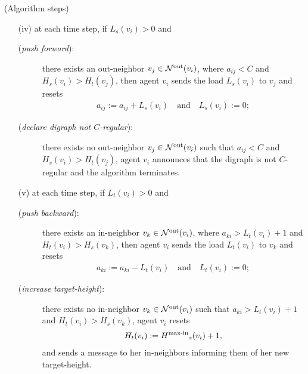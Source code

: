 \documentclass[final]{siamltex}
\begin{document}
(Algorithm steps)
\begin{enumerate}

\item[(iv)] at each time step, if $ L_s(v_i)>0 $ and
  \begin{description}

  \item[(\emph{push forward}):] there exists an out-neighbor $ v_j \in
    {{{\mathcal{N}}^{\textup{{out}}}}}(v_i) $, where $ a_{ij}< C $ and $ H_s(v_i) > H_t(v_j) $,
    then agent $ v_i $ sends the load $ L_s(v_i) $ to $ v_j $ and
    resets
    \begin{align*}
      a_{ij}:=a_{ij}+ L_s(v_i) \quad \text{and} \quad L_s(v_i):=0 ;
    \end{align*}

  \item[(\emph{declare digraph not $ C $-regular}):] there exists no
    out-neighbor $ v_j \in {{{\mathcal{N}}^{\textup{{out}}}}}(v_i) $ such that $ a_{ij}< C $ and $
    H_s(v_i) > H_t(v_j) $, agent $ v_i $ announces that the digraph is
    not $ C $-regular and the algorithm terminates.

  \end{description}

\item[(v)] at each time step, if $ L_t(v_i)>0 $ and
  \begin{description}
  \item[(\emph{push backward}):] there exists an in-neighbor $ v_k \in
    {{{\mathcal{N}}^{\textup{{out}}}}}(v_i) $, where $ a_{ki}> L_t(v_i)+1 $ and $ H_t(v_i) >
    H_s(v_k) $, then agent $ v_i $ sends the load $ L_t(v_i) $ to $
    v_k $ and resets
    \begin{align*}
      a_{ki}:=a_{ki}-L_t(v_i) \quad \text{and} \quad L_t(v_i):=0 ;
    \end{align*}
  \item[(\emph{increase target-height}):] there exists no
    in-neighbor $ v_k \in {{{\mathcal{N}}^{\textup{{out}}}}}(v_i) $ such that $ a_{ki}> L_t(v_i)+1
    $ and $ H_t(v_i) > H_s(v_k) $, agent $v_i$ resets
    \begin{align*}
      H_t(v_i):={{H}^{\textup{{max-in}}}}_s(v_i)+1 ,
    \end{align*}
    and sends a message to her in-neighbors informing them of her new
    target-height.
  \end{description}

  
  
\end{enumerate}
\end{document}
